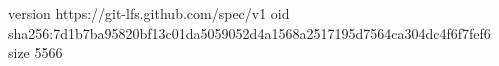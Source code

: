 version https://git-lfs.github.com/spec/v1
oid sha256:7d1b7ba95820bf13c01da5059052d4a1568a2517195d7564ca304dc4f6f7fef6
size 5566
